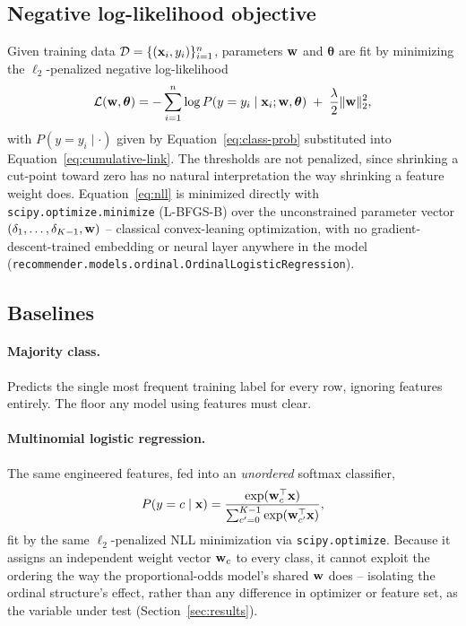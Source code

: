 \subsection{Negative log-likelihood objective}

Given training data $\mathcal{D} = \{(\mathbf{x}_i, y_i)\}_{i=1}^{n}$, parameters
$\mathbf{w}$ and $\boldsymbol{\theta}$ are fit by minimizing the $\ell_2$-penalized
negative log-likelihood
\begin{equation}
  \mathcal{L}(\mathbf{w}, \boldsymbol{\theta})
  = -\sum_{i=1}^{n} \log P(y = y_i \mid \mathbf{x}_i; \mathbf{w}, \boldsymbol{\theta})
  \; + \; \frac{\lambda}{2} \lVert \mathbf{w} \rVert_2^2 ,
  \label{eq:nll}
\end{equation}
with $P(y = y_i \mid \cdot)$ given by Equation~\ref{eq:class-prob}
substituted into Equation~\ref{eq:cumulative-link}. The thresholds are not
penalized, since shrinking a cut-point toward zero has no natural
interpretation the way shrinking a feature weight does. Equation~\ref{eq:nll}
is minimized directly with \texttt{scipy.optimize.minimize} (L-BFGS-B) over
the unconstrained parameter vector
$(\delta_1, \dots, \delta_{K-1}, \mathbf{w})$ -- classical convex-leaning
optimization, with no gradient-descent-trained embedding or neural layer
anywhere in the model
(\texttt{recommender.models.ordinal.OrdinalLogisticRegression}).

\subsection{Baselines}

\paragraph{Majority class.} Predicts the single most frequent training
label for every row, ignoring features entirely. The floor any model using
features must clear.

\paragraph{Multinomial logistic regression.} The same engineered features,
fed into an \emph{unordered} softmax classifier,
\begin{equation}
  P(y = c \mid \mathbf{x}) = \frac{\exp(\mathbf{w}_c^\top \mathbf{x})}
  {\sum_{c'=0}^{K-1} \exp(\mathbf{w}_{c'}^\top \mathbf{x})},
\end{equation}
fit by the same $\ell_2$-penalized NLL minimization via
\texttt{scipy.optimize}. Because it assigns an independent weight vector
$\mathbf{w}_c$ to every class, it cannot exploit the ordering the way the
proportional-odds model's shared $\mathbf{w}$ does -- isolating the ordinal
structure's effect, rather than any difference in optimizer or feature set,
as the variable under test (Section~\ref{sec:results}).

